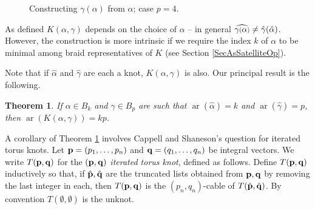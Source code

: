 \documentclass[11pt]{amsart}
\def\ar{\operatorname{ar}}
\newcommand*{\smallp}[1]{\scalebox{.75}{\ensuremath#1}}
\newcommand{\pp}[2][p]{\imath_{\hspace*{-1pt}#1}\hspace*{-.5pt}\smallp(#2\smallp)}
\newtheorem{thm}{Theorem}[section]
\theoremstyle{definition}
\begin{document}
\begin{figure}[ht]
  \caption{Constructing $\gamma(\alpha)$ from $\alpha$; case $p=4$.}
  \label{FigBraidSat}
  \end{figure}

As defined $K(\alpha,\gamma)$ depends on the choice of $\alpha$ {--} in general $\widehat{\gamma\smallp(\alpha\smallp)} \ne \hat{\gamma}(\hat{\alpha})$. However, the construction is more intrinsic if we require the index $k$ of $\alpha$ to be minimal among braid representatives of $K$ (see Section \ref{SecAsSatelliteOp}). 

Note that if $\hat{\alpha}$ and $\hat{\gamma}$ are each a knot, $K(\alpha,\gamma)$ is also. Our principal result is the following.

\begin{thm}\label{main}
If $\alpha\in B_k$ and $\gamma\in B_p$ are such that $\ar(\hat{\alpha})=k$ and $\ar(\hat{\gamma})=p$, then $\ar(K(\alpha,\gamma))=kp$.
\end{thm}

A corollary of Theorem \ref{main} involves Cappell and Shaneson's question for iterated torus knots. Let ${\bf p}=(p_1,\ldots,p_n)$ and ${\bf q}=(q_1,\ldots,q_n)$ be integral vectors. We write $T({\bf p},{\bf q})$ for the $({\bf p},{\bf q})$ \emph{iterated torus knot}, defined as follows. Define $T({\bf p},{\bf q})$ inductively so that, if $\hat{\bf p}, \hat{\bf q}$ are the truncated lists obtained from ${\bf p},{\bf q}$ by removing the last integer in each, then $T({\bf p},{\bf q})$ is the $(p_n,q_n)$-cable of $T(\hat{\bf p},\hat{\bf q})$. By convention $T(\emptyset,\emptyset)$ is the unknot.
\end{document}
